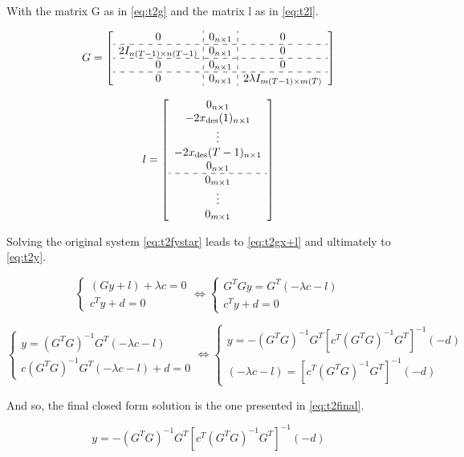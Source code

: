 With the matrix G as in \eqref{eq:t2g} and the matrix l as in \eqref{eq:t2l}.

\begin{equation}
\label{eq:t2g}
G = 
\left[
\begin{array}{c : c : c}
0 & 0_{n \times 1} & 0 \\ \hdashline
2I_{n(T-1) \times n(T-1)} & 0_{n \times 1} & 0 \\ \hdashline
0 & 0_{n \times 1} & 0 \\ \hdashline
0 & 0_{n \times 1} & 2 \lambda I_{m(T-1) \times m(T)}
\end{array}
\right]
\end{equation}

\begin{equation}
\label{eq:t2l}
l = 
\left[
\begin{array}{c}
0_{n \times 1} \\
-2 x_\text{des}(1)_{n \times 1} \\
\vdots \\
-2 x_\text{des}(T-1)_{n \times 1} \\
0_{n \times 1} \\ \hdashline
0_{m \times 1} \\
\vdots \\
0_{m \times 1}
\end{array}
\right]
\end{equation}


Solving the original system \eqref{eq:t2fystar} leads to \eqref{eq:t2gx+l} and ultimately to \eqref{eq:t2y}.

\begin{equation}
\label{eq:t2gx+l}
\begin{cases}
	(Gy + l) + \lambda c = 0 \\
	c^T y + d = 0
\end{cases} \Leftrightarrow
\begin{cases}
	G^T G y = G^T (- \lambda c - l) \\
	c^T y + d = 0
\end{cases}
\end{equation}

\begin{equation}
\label{eq:t2y}
\begin{cases}
	y = (G^T G)^{-1} G^T (- \lambda c -l) \\
	c (G^T G)^{-1} G^T (- \lambda c - l) + d = 0
\end{cases} \Leftrightarrow
\begin{cases}
	y = - (G^T G)^{-1} G^T [c^T (G^T G)^{-1} G^T]^{-1} (-d) \\
	(-\lambda c - l) = [c^T (G^T G)^{-1} G^T]^{-1} (-d)  
\end{cases}
\end{equation}

And so, the final closed form solution is the one presented in \eqref{eq:t2final}.

\begin{equation}
\label{eq:t2final}
    y = - (G^T G)^{-1} G^T [c^T (G^T G)^{-1} G^T]^{-1} (-d)
\end{equation}
